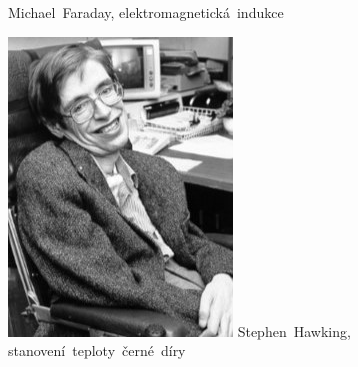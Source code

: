 \documentclass{../../../../style/mkimain}
\begin{document}
\begin{figure}[H]
\begin{center}
        Michael~Faraday, elektromagnetická~indukce
      \end{center}
  \endminipage\hfill
  \begin{center}
    \includegraphics[width=0.8\linewidth]{images/stephen-hawking.jpg}
        Stephen~Hawking, stanovení~teploty~černé~díry
      \end{center}
  \endminipage
\end{figure}
\end{document}
